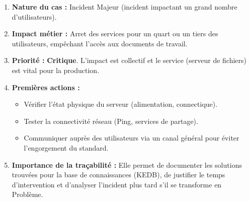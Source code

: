 \documentclass[12pt,a4paper]{extarticle}
\begin{document}
\begin{enumerate}
    \item \textbf{Nature du cas :} Incident Majeur (incident impactant un grand nombre d'utilisateurs).
    \item \textbf{Impact métier :} Arret des services pour un quart ou un tiers des utilisateurs, empêchant l'accès aux documents de travail.
    \item \textbf{Priorité :} \textbf{Critique}. L'impact est collectif et le service (serveur de fichiers) est vital pour la production.
    \item \textbf{Premières actions :}
    \begin{itemize}
        \item Vérifier l'état physique du serveur (alimentation, connectique).
        \item Tester la connectivité réseau (Ping, services de partage).
        \item Communiquer auprès des utilisateurs via un canal général pour éviter l'engorgement du standard.
    \end{itemize}
    \item \textbf{Importance de la traçabilité :} Elle permet de documenter les solutions trouvées pour la base de connaissances (KEDB), de justifier le temps d'intervention et d'analyser l'incident plus tard s'il se transforme en Problème.
\end{enumerate}
\end{document}
